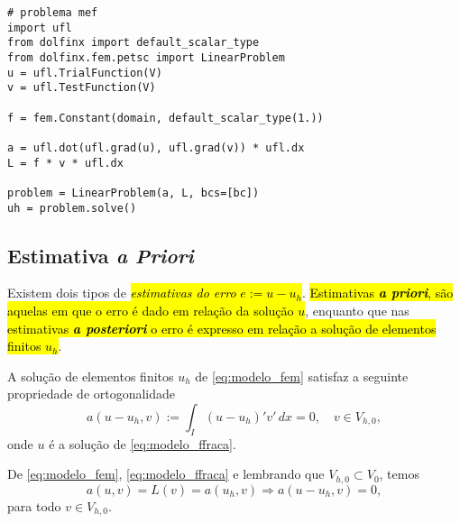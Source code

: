 \begin{ex}
\begin{lstlisting}[caption=ex\_mef1d\_modelo.py]
# problema mef
import ufl
from dolfinx import default_scalar_type
from dolfinx.fem.petsc import LinearProblem
u = ufl.TrialFunction(V)
v = ufl.TestFunction(V)

f = fem.Constant(domain, default_scalar_type(1.))

a = ufl.dot(ufl.grad(u), ufl.grad(v)) * ufl.dx
L = f * v * ufl.dx

problem = LinearProblem(a, L, bcs=[bc])
uh = problem.solve()
\end{lstlisting}
\end{ex}

\subsection{Estimativa \textit{a Priori}}
\badgeRevisar

Existem dois tipos de \hl{\emph{estimativas do erro} $e := u - u_h$}. \hl{Estimativas \textbf{\textit{a priori}}, são aquelas em que o erro é dado em relação da solução $u$}, enquanto que nas \hl{estimativas \textbf{\textit{a posteriori}} o erro é expresso em relação a solução de elementos finitos $u_h$}.

\begin{teo}\label{teo:ortogonalidade_de_Galerkin}
  A solução de elementos finitos $u_h$ de \eqref{eq:modelo_fem} satisfaz a seguinte propriedade de ortogonalidade
  \begin{equation}
    a(u-u_h,v) := \int_I (u-u_h)'v'\,dx = 0,\quad v\in V_{h,0},
  \end{equation}
onde $u$ é a solução de \eqref{eq:modelo_ffraca}.
\end{teo}
\begin{dem}
  De \eqref{eq:modelo_fem}, \eqref{eq:modelo_ffraca} e lembrando que $V_{h,0}\subset V_0$, temos
  \begin{equation}
    a(u,v) = L(v) = a(u_h,v) \Rightarrow a(u-u_h, v) = 0,
  \end{equation}
para todo $v\in V_{h,0}$.
\end{dem}

